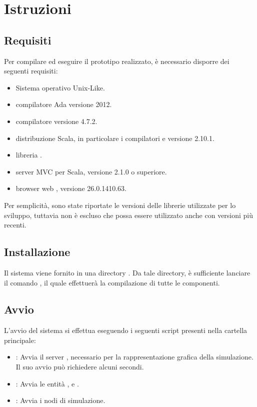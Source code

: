 \appendix
\chapter{Istruzioni}
	
	\section{Requisiti}
	
	Per compilare ed eseguire il prototipo realizzato, è necessario disporre dei seguenti requisiti:
	
	\begin{itemize}
		\item Sistema operativo Unix-Like.
		\item compilatore Ada  versione 2012.
		\item compilatore  versione 4.7.2.
		\item distribuzione Scala, in particolare i compilatori  e  versione 2.10.1.
		\item libreria .
		\item server MVC  per Scala, versione 2.1.0 o superiore.
		\item browser web , versione 26.0.1410.63.
	\end{itemize}
	
	Per semplicità, sono state riportate le versioni delle librerie utilizzate per lo sviluppo, tuttavia non è escluso che possa essere utilizzato anche con versioni più recenti.
	
	\section{Installazione}
	
	Il sistema viene fornito in una directory . Da tale directory, è sufficiente lanciare il comando , il quale effettuerà la compilazione di tutte le componenti.
	
	\section{Avvio}
	
	L'avvio del sistema si effettua eseguendo i seguenti script presenti nella cartella principale:
	
		\begin{itemize}
			\item {} : Avvia il server , necessario per la rappresentazione grafica della simulazione. Il suo avvio può richiedere alcuni secondi.
			\item {} : Avvia le entità ,  e .
			\item {} : Avvia i nodi di simulazione.
		\end{itemize}
		
